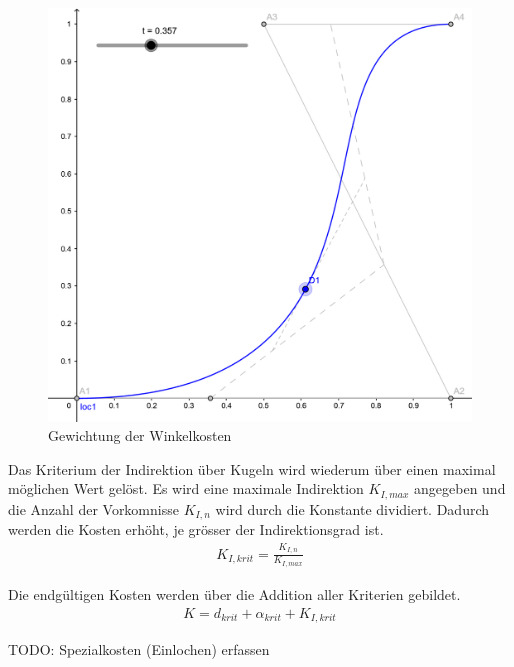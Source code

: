 \begin{figure}[h!]
    \begin{center}
        \includegraphics[width=0.6\linewidth]{../common/03_billiard_ai/resources/30_suchbaum_gewichtung_winkelkosten.png}
    \end{center}
    \caption{Gewichtung der Winkelkosten}
    \label{fig:suche_knoten_gewichtung_winkelkosten}
\end{figure}

Das Kriterium der Indirektion über Kugeln wird wiederum über einen maximal möglichen Wert gelöst.
Es wird eine maximale Indirektion $K_{I,max}$ angegeben und die Anzahl der Vorkomnisse ${K_{I,n}}$ wird durch die
Konstante dividiert. Dadurch werden die Kosten erhöht, je grösser der Indirektionsgrad ist.
\begin{align}
    K_{I,krit} = \frac{K_{I,n}}{K_{I,max}}
\end{align}

Die endgültigen Kosten werden über die Addition aller Kriterien gebildet.
\begin{align}
    K = d_{krit} + \alpha_{krit} + K_{I,krit}
\end{align}

TODO: Spezialkosten (Einlochen) erfassen
